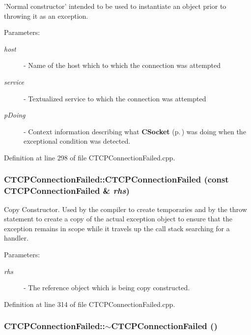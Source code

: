'Normal constructor' intended to be used to instantiate an object prior to throwing it as an exception.\begin{Desc}
\item[Parameters: ]\par
\begin{description}
\item[{\em 
host}]- Name of the host which to which the connection was attempted \item[{\em 
service}]- Textualized service to which the connection was attempted \item[{\em 
p\-Doing}]- Context information describing what {\bf CSocket} {\rm (p.\,\pageref{classCSocket})} was doing when the exceptional condition was detected. \end{description}
\end{Desc}


Definition at line 298 of file CTCPConnection\-Failed.cpp.
\subsubsection{\setlength{\rightskip}{0pt plus 5cm}CTCPConnection\-Failed::CTCPConnection\-Failed (const CTCPConnection\-Failed \& {\em rhs})}\label{classCTCPConnectionFailed_a1}


Copy Constructor. Used by the compiler to create temporaries and by the throw statement to create a copy of the actual exception object to ensure that the exception remains in scope while it travels up the call stack  searching for a handler.\begin{Desc}
\item[Parameters: ]\par
\begin{description}
\item[{\em 
rhs}]- The reference object which is being copy constructed. \end{description}
\end{Desc}


Definition at line 314 of file CTCPConnection\-Failed.cpp.
\subsubsection{\setlength{\rightskip}{0pt plus 5cm}CTCPConnection\-Failed::$\sim$CTCPConnection\-Failed ()\hspace{0.3cm}{\tt  [inline]}}\label{classCTCPConnectionFailed_a2}


